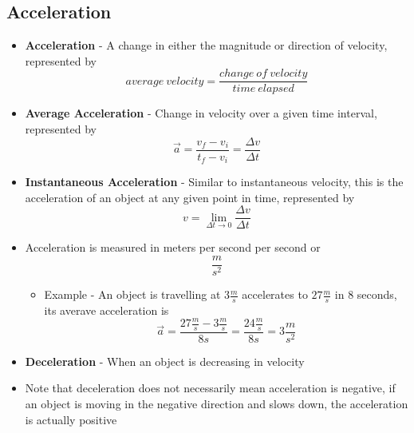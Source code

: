 \subsection{Acceleration}
\begin{itemize}
    \item \textbf{Acceleration} - A change in either the magnitude or direction of velocity, represented by
    \[average\ velocity=\frac{change\ of\ velocity}{time\ elapsed}\]
    \item \textbf{Average Acceleration} - Change in velocity over a given time interval, represented by \[\vec{a}=\frac{v_f-v_i}{t_f-v_i}=\frac{\Delta v}{\Delta t}\]
    \item \textbf{Instantaneous Acceleration} - Similar to instantaneous velocity, this is the acceleration of an object at any given point in time, represented by \[v=\lim_{\Delta t\to 0}\frac{\Delta v}{\Delta t}\]
    \item Acceleration is measured in meters per second per second or \[\frac{m}{s^2}\]
    \begin{itemize}
        \item Example - An object is travelling at $3\frac{m}{s}$ accelerates to $27\frac{m}{s}$ in 8 seconds, its averave acceleration is \[\vec{a}=\frac{27\frac{m}{s}-3\frac{m}{s}}{8s}=\frac{24\frac{m}{s}}{8s}=3\frac{m}{s^2}\]
    \end{itemize}
    \item \textbf{Deceleration} - When an object is decreasing in velocity
    \item Note that deceleration does not necessarily mean acceleration is negative, if an object is moving in the negative direction and slows down, the acceleration is actually positive
\end{itemize}

